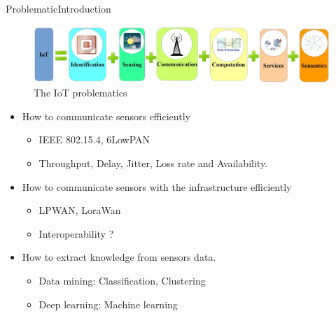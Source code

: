 \begin{frame}{Problematic}{Introduction}

\begin{figure}
	\includegraphics[width=.7\columnwidth]{res/iotChallenges.png}
	\caption{\label{fig:iotChallenges}The IoT problematics}
\end{figure}

\begin{itemize}
	\item How to communicate sensors efficiently
		\begin{itemize}
			\item IEEE 802.15.4, 6LowPAN
			\item Throughput, Delay, Jitter, Loss rate and Availability.
		\end{itemize}
	\item How to communicate sensors with the infrastructure efficiently
		\begin{itemize}
			\item LPWAN, LoraWan
			\item Interoperability ?
		\end{itemize}
	\item How to extract knowledge from sensors data.
		\begin{itemize}
			\item Data mining: Classification, Clustering
			\item Deep learning: Machine learning
		\end{itemize}
\end{itemize}
	
	
\end{frame}

